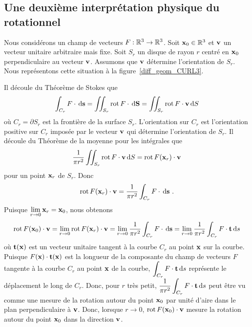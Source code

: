 {\subsection{Une deuxième interprétation physique du rotationnel}
\label{sectGreenCurlInterp}

Nous considérons un champ de vecteurs $F:\mathbb{R}^3 \to \mathbb{R}^3$.  Soit
$\mathbf{x}_0 \in \mathbb{R}^3$ et $\mathbf{v}$ un vecteur unitaire arbitraire mais
fixe.  Soit $S_r$ un disque de rayon $r$ centré en 
$\mathbf{x}_0$ perpendiculaire au vecteur $\mathbf{v}$.  Assumons que
$\mathbf{v}$ détermine l'orientation de $S_r$.  Nous représentons cette
situation à la figure~\ref{diff_geom_CURL3}.


Il découle du Théorème de Stokes que
\[
  \int_{C_r} F\cdot \,\mathrm{d}\mathbf{s}
= \iint_{S_r} \operatorname{rot} F \cdot \,\mathrm{d}\mathbf{S}
= \iint_{S_r} \operatorname{rot} F \cdot \mathbf{v} \,\mathrm{d}S
\]
où $C_r = \partial S_r$ est la frontière de la surface $S_r$.
L'orientation sur $C_r$ est l'orientation positive sur $C_r$ imposée
par le vecteur $\mathbf{v}$ qui détermine l'orientation de $S_r$.
Il découle du Théorème de la moyenne pour les intégrales que
\[
 \frac{1}{\pi r^2} \iint_{S_r} \operatorname{rot} F \cdot \mathbf{v} \,\mathrm{d}S
= \operatorname{rot} F(\mathbf{x}_r) \cdot \mathbf{v}
\]
pour un point $\mathbf{x}_r$ de $S_r$.  Donc
\[
  \operatorname{rot} F(\mathbf{x}_r) \cdot \mathbf{v}  = \frac{1}{\pi r^2}
  \int_{C_r} F\cdot \,\mathrm{d}\mathbf{s} \ .
\]
Puisque $\displaystyle \lim_{r\to 0} \mathbf{x}_r = \mathbf{x}_0$, nous obtenons
\[
\operatorname{rot} F(\mathbf{x}_0) \cdot \mathbf{v}
= \lim_{r\to 0} \operatorname{rot} F(\mathbf{x}_r) \cdot \mathbf{v}
= \lim_{r \to 0} \frac{1}{\pi r^2} \int_{C_r} F\cdot \,\mathrm{d}\mathbf{s}
= \lim_{r \to 0} \frac{1}{\pi r^2} \int_{C_r} F\cdot \mathbf{t} \,\mathrm{d}s
\]
où $\mathbf{t}(\mathbf{x})$ est un vecteur unitaire tangent à la courbe $C_r$
au point $\mathbf{x}$ sur la courbe.  Puisque
$F(\mathbf{x})\cdot \mathbf{t}(\mathbf{x})$ est la longueur de
la composante du champ de vecteurs $F$ tangente à la courbe $C_r$
au point $\mathbf{x}$ de la courbe,
$\displaystyle \int_{C_r} F\cdot \mathbf{t} \,\mathrm{d}s$ représente le
déplacement le long de $C_r$.  Donc, pour $r$ très petit,
$\displaystyle \frac{1}{\pi r^2} \int_{C_r} F\cdot \mathbf{t} \,\mathrm{d}s$
peut être vu comme une mesure de la rotation autour du point
$\mathbf{x}_0$ par unité d'aire dans le plan perpendiculaire à
$\mathbf{v}$.  Donc, lorsque $r \to 0$,
$\operatorname{rot} F(\mathbf{x}_0) \cdot \mathbf{v}$ mesure la rotation autour du
point $\mathbf{x}_0$ dans la direction $\mathbf{v}$.

}
